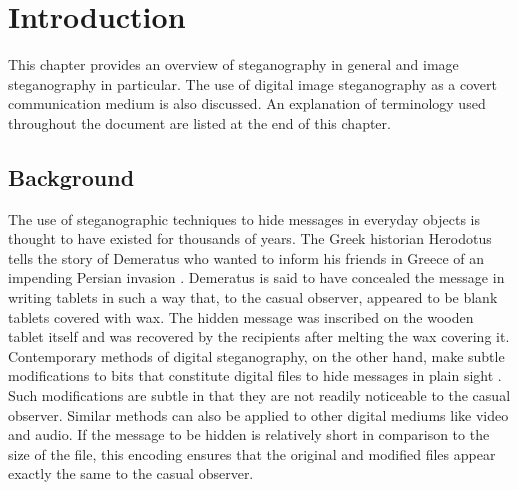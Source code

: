 \chapter{Introduction}
\label{ch:intro}
This chapter provides an overview of steganography in general and image steganography in particular. The use of digital image steganography as a covert communication medium is also discussed. An explanation of terminology used throughout the document are listed at the end of this chapter. 
\section{Background}
The use of steganographic techniques to hide messages in everyday objects is thought to have existed for thousands of years. The Greek historian Herodotus tells the story of Demeratus who wanted to inform his friends in Greece of an impending Persian invasion  \cite{kahn1996history}. Demeratus is said to have concealed the message in writing tablets in such a way that, to the casual observer, appeared to be blank tablets covered with wax. The hidden message was inscribed on the wooden tablet itself and was recovered by the recipients after melting the wax covering it. 
Contemporary methods of digital steganography, on the other hand, make subtle modifications to bits that constitute digital files to hide messages in plain sight  \cite{hinson2009introduction}.  Such modifications are subtle in that they are not readily noticeable to the casual observer.   Similar methods can also be applied to other digital mediums like video \cite{crawford2010supraliminal} and audio. If the message to be hidden is relatively short in comparison to the size of the file, this encoding ensures that the original and modified files appear exactly the same to the casual observer.
